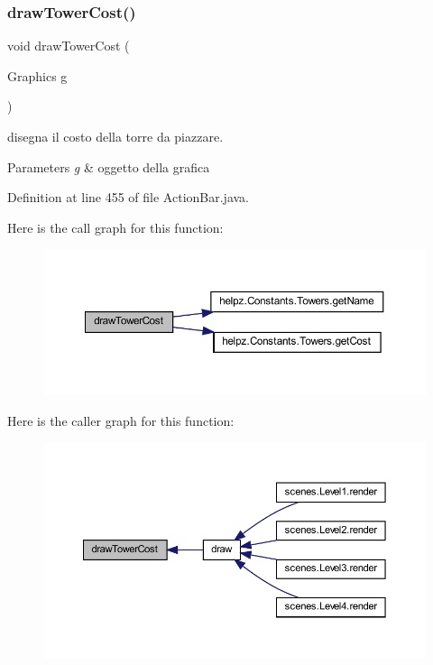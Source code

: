 \subsubsection{\texorpdfstring{draw\+Tower\+Cost()}{drawTowerCost()}}
{\footnotesize\ttfamily void draw\+Tower\+Cost (\begin{DoxyParamCaption}\item[{Graphics}]{g }\end{DoxyParamCaption})}



disegna il costo della torre da piazzare. 


\begin{DoxyParams}{Parameters}
{\em g} & oggetto della grafica \\
\hline
\end{DoxyParams}


Definition at line 455 of file Action\+Bar.\+java.

Here is the call graph for this function\+:\nopagebreak
\begin{figure}[H]
\begin{center}
\leavevmode
\includegraphics[width=350pt]{classui_1_1_action_bar_a32afe6a393c6361d391e26ed96971131_cgraph}
\end{center}
\end{figure}
Here is the caller graph for this function\+:\nopagebreak
\begin{figure}[H]
\begin{center}
\leavevmode
\includegraphics[width=350pt]{classui_1_1_action_bar_a32afe6a393c6361d391e26ed96971131_icgraph}
\end{center}
\end{figure}
\mbox{\label{classui_1_1_action_bar_a7075e1ba9a7135d89d02dca2e3b8860e}} 
